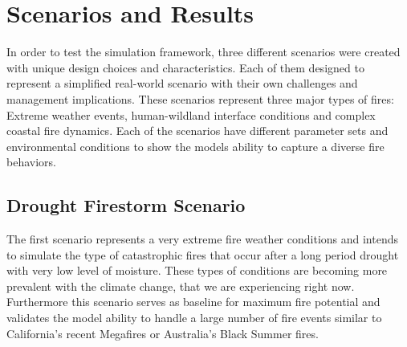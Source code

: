 \section{Scenarios and Results}
In order to test the simulation framework, three different scenarios were created with unique design choices and characteristics. Each of them designed to represent a simplified real-world scenario with their own challenges and management implications. These scenarios represent three major types of fires: Extreme weather events, human-wildland interface conditions and complex coastal fire dynamics. Each of the scenarios have different parameter sets and environmental conditions to show the models ability to capture a diverse fire behaviors.

\subsection{Drought Firestorm Scenario}
The first scenario represents a very extreme fire weather conditions and intends to simulate the type of catastrophic fires that occur after a long period drought with very low level of moisture. These types of conditions are becoming more prevalent with the climate change, that we are experiencing right now. Furthermore this scenario serves as baseline for maximum fire potential and validates the model ability to handle a large number of fire events similar to California's recent Megafires or Australia's Black Summer fires.

